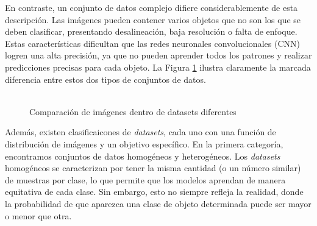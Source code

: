 En contraste, un conjunto de datos complejo difiere considerablemente de 
esta descripción. Las imágenes pueden contener varios objetos que no son 
los que se deben clasificar, presentando desalineación, baja resolución 
o falta de enfoque. Estas características dificultan que las redes 
neuronales convolucionales (CNN) logren una alta precisión, ya que no 
pueden aprender todos los patrones y realizar predicciones precisas para 
cada objeto. La Figura \ref{fig:combined} ilustra claramente la marcada 
diferencia entre estos dos tipos de conjuntos de datos.
\\\\
\begin{figure}%
    \centering
    \qquad
    \caption{Comparación de imágenes dentro de datasets diferentes}%
    \label{fig:combined}%
\end{figure}
Además, existen clasificaicones de \textit{datasets}, cada uno con una función de distribución de imágenes y un objetivo específico. En la primera categoría, encontramos conjuntos de datos homogéneos y heterogéneos. Los \textit{datasets} homogéneos se caracterizan por tener la misma cantidad (o un número similar) de muestras por clase, lo que permite que los modelos aprendan de manera equitativa de cada clase. Sin embargo, esto no siempre refleja la realidad, donde la probabilidad de que aparezca una clase de objeto determinada puede ser mayor o menor que otra.
\\\\

